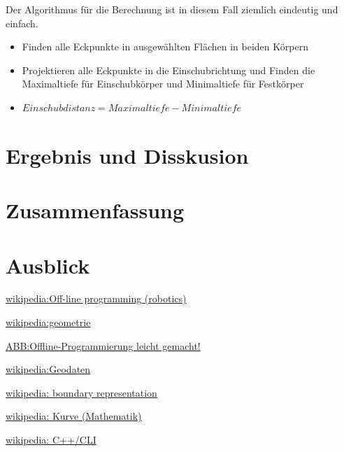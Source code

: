 \documentclass[14pt,a4paper,titlepage]{article}
\begin{document}
	 	Der Algorithmus für die Berechnung ist in diesem Fall ziemlich eindeutig und einfach.
	 		\begin{itemize}
	 			\item Finden alle Eckpunkte in ausgewählten Flächen in beiden Körpern
	 			\item Projektieren alle Eckpunkte in die Einschubrichtung und Finden die Maximaltiefe für Einschubkörper und Minimaltiefe für Festkörper
	 			\item \(Einschubdistanz = Maximaltiefe - Minimaltiefe\)
	 		\end{itemize}
	\section{Ergebnis und Disskusion}
	\section{Zusammenfassung}
	\section{Ausblick}
	\pagebreak
	\begin{thebibliography}{1}
		\href{https://en.wikipedia.org/wiki/Off-line_programming_(robotics)}{wikipedia:Off-line programming (robotics)}
		
		\href{https://de.wikipedia.org/wiki/Geometrie}{wikipedia:geometrie}
		
		\href{https://new.abb.com/products/robotics/de/robotstudio}{ABB:Offline-Programmierung leicht gemacht!}
		
		\href{https://de.wikipedia.org/wiki/Geodaten#Topologie}{wikipedia:Geodaten}
		
		\href{https://en.wikipedia.org/wiki/Boundary_representation}{wikipedia: boundary representation}
		
		\href{https://de.wikipedia.org/wiki/Kurve_(Mathematik)}{wikipedia: Kurve (Mathematik)}
		
		\href{https://de.wikipedia.org/wiki/C%2B%2B/CLI}{wikipedia: C++/CLI}
	\end{thebibliography}
	\pagebreak
	\listoffigures
	\pagebreak
\end{document}
